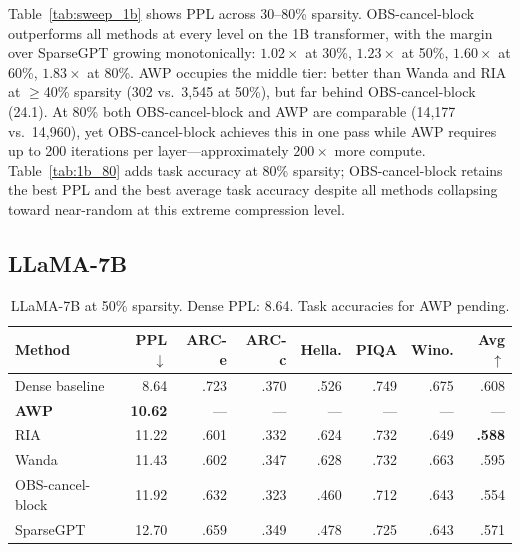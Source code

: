 \documentclass{article}
\begin{document}
Table~\ref{tab:sweep_1b} shows PPL across 30--80\% sparsity.
OBS-cancel-block outperforms all methods at every level on the 1B transformer,
with the margin over SparseGPT growing monotonically: $1.02\times$ at 30\%,
$1.23\times$ at 50\%, $1.60\times$ at 60\%, $1.83\times$ at 80\%.
AWP occupies the middle tier: better than Wanda and RIA at $\geq$40\% sparsity
(302 vs.\ 3{,}545 at 50\%), but far behind OBS-cancel-block (24.1).
At 80\% both OBS-cancel-block and AWP are comparable (14{,}177 vs.\ 14{,}960),
yet OBS-cancel-block achieves this in one pass while AWP requires up to
200 iterations per layer---approximately $200\times$ more compute.
Table~\ref{tab:1b_80} adds task accuracy at 80\% sparsity; OBS-cancel-block
retains the best PPL and the best average task accuracy despite all methods
collapsing toward near-random at this extreme compression level.

\subsection{LLaMA-7B}
\label{sec:llama}

\begin{table}[htbp]
  \centering
  \caption{LLaMA-7B at 50\% sparsity. Dense PPL: 8.64. Task accuracies for AWP pending.}
  \label{tab:llama_50}
  \small
  \begin{tabular}{lrrrrrrr}
    \toprule
    Method & PPL$\downarrow$ & ARC-e & ARC-c & Hella. & PIQA & Wino. & Avg$\uparrow$ \\
    \midrule
    Dense baseline            & 8.64  & .723 & .370 & .526 & .749 & .675 & .608 \\
    \midrule
    \textbf{AWP}              & \textbf{10.62} & ---  & ---  & ---  & ---  & ---  & ---  \\
    RIA                       & 11.22 & .601 & .332 & .624 & .732 & .649 & \textbf{.588} \\
    Wanda                     & 11.43 & .602 & .347 & .628 & .732 & .663 & .595 \\
    OBS-cancel-block          & 11.92 & .632 & .323 & .460 & .712 & .643 & .554 \\
    SparseGPT                 & 12.70 & .659 & .349 & .478 & .725 & .643 & .571 \\
    \bottomrule
  \end{tabular}
\end{table}
\end{document}

